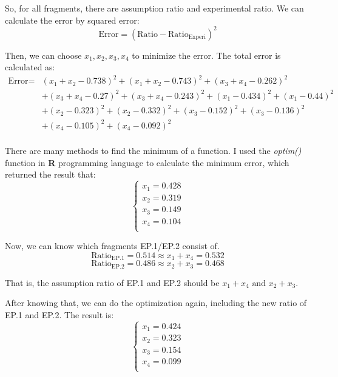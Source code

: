 \documentclass{article}
\begin{document}
            So, for all fragments, there are assumption ratio and experimental ratio. We can calculate the error by squared error:
            $$\text{Error} = (\text{Ratio} - \text{Ratio}_{\text{Experi}})^2$$

            Then, we can choose $x_1, x_2, x_3, x_4$ to minimize the error. The total error is calculated as:
            $$\begin{aligned}
            \text{Error} = &(x_1 + x_2 - 0.738) ^ 2 + (x_1 + x_2 - 0.743) ^ 2 + (x_3 + x_4 - 0.262) ^ 2\\
            &+(x_3 + x_4 - 0.27) ^ 2 + (x_3 + x_4 - 0.243) ^ 2 + (x_1 - 0.434)^2 + (x_1 - 0.44)^2\\
            &+(x_2 - 0.323)^2 + (x_2 - 0.332)^2 + (x_3 - 0.152)^2 + (x_3 - 0.136)^2\\
            &+(x_4 - 0.105)^2 + (x_4 - 0.092)^2\\
            \end{aligned}$$

            There are many methods to find the minimum of a function. I used the \textit{optim()} function in \textbf{R} programming language to calculate the minimum error, which returned the result that:
            $$\left\{\begin{aligned}
            x_1 = 0.428\\
            x_2 = 0.319\\
            x_3 = 0.149\\
            x_4 = 0.104\\
            \end{aligned}\right.$$

            Now, we can know which fragments EP.1/EP.2 consist of.
            $$\text{Ratio}_{\text{EP.1}} = 0.514 \approx x_1 + x_4 = 0.532$$
            $$\text{Ratio}_{\text{EP.2}} = 0.486 \approx x_2 + x_3 = 0.468$$

            That is, the assumption ratio of EP.1 and EP.2 should be $x_1 + x_4 \text{ and } x_2 + x_3$.

            After knowing that, we can do the optimization again, including the new ratio of EP.1 and EP.2.
            The result is:
            $$\left\{\begin{aligned}
            x_1 = 0.424\\
            x_2 = 0.323\\
            x_3 = 0.154\\
            x_4 = 0.099\\
            \end{aligned}\right.$$
\end{document}

